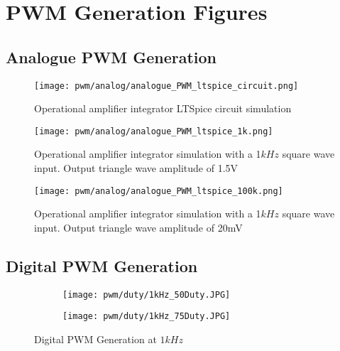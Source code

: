 \chapter{PWM Generation Figures} \label{A:PWM}

\section{Analogue PWM Generation} \label{A:analogue_PWM}


\begin{figure}[H]
    \texttt{[image: pwm/analog/analogue\_PWM\_ltspice\_circuit.png]}
    \caption{Operational amplifier integrator LTSpice circuit simulation}
\end{figure}

\begin{figure}[H]
    \texttt{[image: pwm/analog/analogue\_PWM\_ltspice\_1k.png]}
    \caption{Operational amplifier integrator simulation with a 1$kHz$ square wave input. Output triangle wave amplitude of 1.5V}
\end{figure}

\begin{figure}[H]
    \texttt{[image: pwm/analog/analogue\_PWM\_ltspice\_100k.png]}
    \caption{Operational amplifier integrator simulation with a 1$kHz$ square wave input. Output triangle wave amplitude of 20mV}
\end{figure}


\section{Digital PWM Generation} \label{A:digital_PWM}

\begin{figure}[H]
    \centering
    \begin{subfigure}{0.45\textwidth}
        \texttt{[image: pwm/duty/1kHz\_50Duty.JPG]}

    \end{subfigure}
    \begin{subfigure}{0.45\textwidth}
        \texttt{[image: pwm/duty/1kHz\_75Duty.JPG]}

    \end{subfigure}
    \caption{Digital PWM Generation at $1kHz$}

\end{figure}

